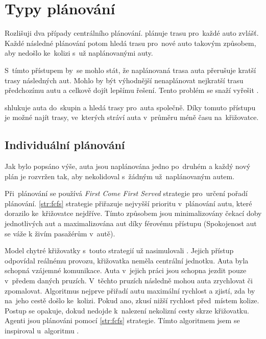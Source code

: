 \section{Typy plánování}\label{sec:typy_planovani}


Rozlišuji dva případy centrálního plánování.
\textit{} plánuje trasu pro~každé auto zvlášť.
Každé následné plánování potom hledá trasu pro~nové auto takovým způsobem, aby nedošlo ke~kolizi s~už naplánovanými auty.

S~tímto přístupem by~se mohlo stát, že naplánovaná trasa auta přerušuje kratší trasy následných aut.
Mohlo by být výhodnější nenaplánovat nejkratší trasu předchozímu autu a celkově dojít lepšímu řešení.
Tento problém se snaží vyřešit .

\textit{} shlukuje auta do~skupin a hledá trasy pro~auta společně.
Díky tomuto přístupu je možné najít trasy, ve~kterých stráví auta v~průměru méně času na~křižovatce.

\subsection{Individuální plánování}\label{subsec:individualni_planovani}

%
%

Jak bylo popsáno výše, auta jsou naplánována jedno po~druhém a
každý nový plán je rozvržen tak, aby nekolidoval s~žádným už~naplánovaným autem.

Při~plánování se používá \emph{First Come First Served}  strategie pro~určení pořadí plánování.
\ref{str:fcfs} strategie přiřazuje nejvyšší prioritu v~plánování autu, které dorazilo ke~křižovatce nejdříve.
Tímto způsobem jsou minimalizovány čekací doby jednotlivých aut
a maximalizována  aut díky férovému přístupu (Spokojenost aut se váže k živím pasažérům v~autě).

Model chytré křižovatky s~touto strategií už nasimulovali \citet*{Dresner}.
Jejich přístup odpovídal reálnému provozu, křižovatka neměla centrální jednotku.
Auta byla schopná vzájemné komunikace.
Auta v~jejich práci jsou schopna jezdit pouze v~předem daných pruzích.
V~těchto pruzích následně mohou auta zrychlovat či zpomalovat.
Algoritmus nejprve přiřadí autu maximální rychlost a zjistí, zda by na~jeho cestě došlo ke~kolizi.
Pokud ano, zkusí nižší rychlost před~místem kolize.
Postup se opakuje, dokud nedojde k~nalezení nekolizní cesty skrze křižovatku.
Agenti jsou plánováni pomocí \ref{str:fcfs} strategie.
Tímto algoritmem jsem se inspiroval u~algoritmu .


